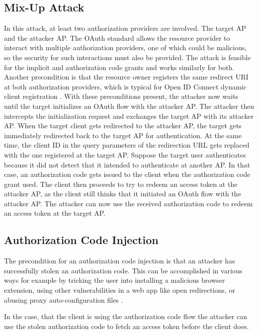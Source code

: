\documentclass[
    fontsize=12pt,
    headings=small,
    parskip=half,           %
    bibliography=totoc,
    numbers=noenddot,       %
    open=any,               %
    ]{scrreprt}
\begin{document}
\subsection{Mix-Up Attack}
In this attack, at least two authorization providers are involved. The target AP and the attacker AP. The OAuth standard allows the resource provider to interact with multiple authorization providers, one of which could be malicious, so the security for such interactions must also be provided. The attack is feasible for the implicit and authorization code grants and works similarly for both. Another precondition is that the resource owner registers the same redirect URI at both authorization providers, which is typical for Open ID Connect dynamic client registration \cite{hosseyni2023formal}. With these preconditions present, the attacker now waits until the target initializes an OAuth flow with the attacker AP. The attacker then intercepts the initialization request and exchanges the target AP with its attacker AP. When the target client gets redirected to the attacker AP, the target gets immediately redirected back to the target AP for authentication. At the same time, the client ID in the query parameters of the redirection URL gets replaced with the one registered at the target AP. Suppose the target user authenticates because it did not detect that it intended to authenticate at another AP. In that case, an authorization code gets issued to the client when the authorization code grant used. The client then proceeds to try to redeem an access token at the attacker AP, as the client still thinks that it initiated an OAuth flow with the attacker AP. The attacker can now use the received authorization code to redeem an access token at the target AP. \cite{fett2016comprehensive}

\subsection{Authorization Code Injection \cite{philippaerts2022oauch}} 
The precondition for an authorization code injection is that an attacker has
successfully stolen an authorization code. This can be accomplished in various
ways for example by tricking the user into installing a malicious browser
extension, using other vulnerabilities in a web app like open redirections, or
abusing proxy auto-configuration files \cite*{philippaerts2022oauch}.

In the case, that the client is using the authorization code flow the attacker
can use the stolen authorization code to fetch an access token before the
client does.
\end{document}
